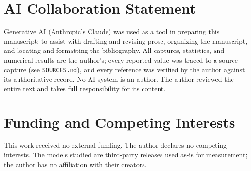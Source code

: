 \documentclass[10pt,twocolumn]{article}
\begin{document}
\section*{AI Collaboration Statement}

Generative AI (Anthropic's Claude) was used as a tool in preparing this
manuscript: to assist with drafting and revising prose, organizing the
manuscript, and locating and formatting the bibliography. All captures,
statistics, and numerical results are the author's; every reported value was
traced to a source capture (see \texttt{SOURCES.md}), and every reference
was verified by the author against its authoritative record. No AI system is
an author. The author reviewed the entire text and takes full responsibility
for its content.

\section*{Funding and Competing Interests}

This work received no external funding. The author declares no competing
interests. The models studied are third-party releases used as-is for
measurement; the author has no affiliation with their creators.



\end{document}
